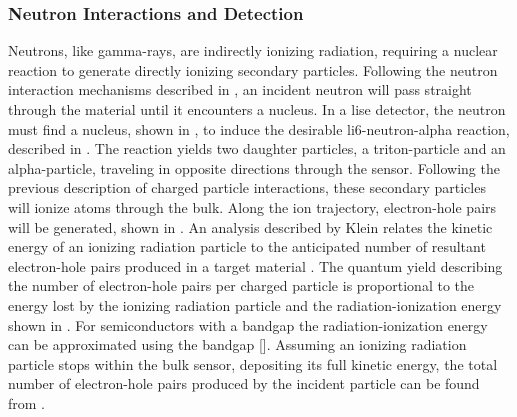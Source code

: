 \documentclass[../../../../main.tex]{subfiles}
\begin{document}
%
    \subsubsection{Neutron Interactions and Detection}%
    \label{sec:chapter-2:semiconductor-detectors:pulse-formation:neutrons}%
    Neutrons, like \glspl{gamma-ray}, are indirectly ionizing radiation, requiring a nuclear reaction to generate directly ionizing secondary particles.
    Following the neutron interaction mechanisms described in , an incident neutron will pass straight through the material until it encounters a nucleus. 
    In a \gls{lise} detector, the neutron must find a  nucleus, shown in , to induce the desirable \gls{li6-neutron-alpha} reaction, described in .
    The reaction yields two daughter particles, a \gls{triton-particle} and an \gls{alpha-particle}, traveling in opposite directions through the sensor.
    Following the previous description of charged particle interactions, these secondary particles will ionize atoms through the bulk.
    Along the ion trajectory, electron-hole pairs will be generated, shown in .
    An analysis described by Klein relates the kinetic energy of an ionizing radiation particle to the anticipated number of resultant electron-hole pairs produced in a target material \cite{Klein_1968}.
    The quantum yield  describing the number of electron-hole pairs per charged particle is proportional to the energy lost by the ionizing radiation particle  and the radiation-ionization energy \Xvariable{\epsilon} shown in .
    For semiconductors with a bandgap  the radiation-ionization energy can be approximated using the bandgap [].
    Assuming an ionizing radiation particle stops within the bulk sensor, depositing its full kinetic energy, the total number of electron-hole pairs produced by the incident particle can be found from .
\end{document}
